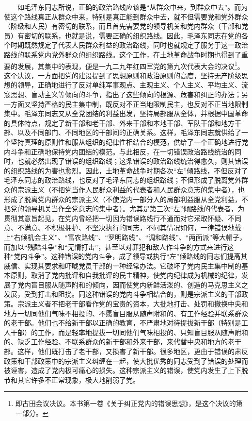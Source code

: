 \documentclass[cn,11pt,chinese]{elegantbook}
\begin{document}
　　如毛泽东同志所说，正确的政治路线应该是“从群众中来，到群众中去”。而为使这个路线真正从群众中来，特别是真正能到群众中去，就不但需要党和党外群众（阶级和人民）有密切的联系，而且首先需要党的领导机关和党内群众（干部和党员）有密切的联系，也就是说，需要正确的组织路线。因此，毛泽东同志在党的各个时期既然规定了代表人民群众利益的政治路线，同时也就规定了服务于这一政治路线的联系党内党外群众的组织路线。这个工作，在土地革命战争时期也得到了重要的发展，其集中的表现，便是一九二九年红四军党的第九次代表大会的决议\footnote[44]{ 即古田会议决议。本书第一卷《关于纠正党内的错误思想》，是这个决议的第一部分。}。这个决议，一方面把党的建设提到了思想原则和政治原则的高度，坚持无产阶级思想的领导，正确地进行了反对单纯军事观点、主观主义、个人主义、平均主义、流寇思想、盲动主义等倾向的斗争，指出了这些倾向的根源、危害和纠正的办法；另一方面又坚持严格的民主集中制，既反对不正当地限制民主，也反对不正当地限制集中。毛泽东同志又从全党团结的利益出发，坚持局部服从全体，并根据中国革命的具体特点，规定了新干部和老干部、外来干部和本地干部、军队干部和地方干部、以及不同部门、不同地区的干部间的正确关系。这样，毛泽东同志就供给了一个坚持真理的原则性和服从组织的纪律性相结合的模范，供给了一个正确地进行党内斗争和正确地保持党内团结的模范。与此相反，在一切错误政治路线统治的同时，也就必然出现了错误的组织路线；这条错误的政治路线统治得愈久，则其错误的组织路线的为害也愈烈。因此，土地革命战争时期各次“左”倾路线，不但反对了毛泽东同志的政治路线，也反对了毛泽东同志的组织路线；不但形成了脱离党外群众的宗派主义（不把党当作人民群众利益的代表者和人民群众意志的集中者），也形成了脱离党内群众的宗派主义（不使党内一部分人的局部利益服从全党利益，不把党的领导机关当作全党意志的集中者）。尤其是第三次“左”倾路线的代表者，为贯彻其意旨起见，在党内曾经把一切因为错误路线行不通而对它采取怀疑、不同意、不满意、不积极拥护、不坚决执行的同志，不问其情况如何，一律错误地戴上“右倾机会主义”、“富农路线”、“罗明路线”、“调和路线”、“两面派”等大帽子，而加以“残酷斗争”和“无情打击”，甚至以对罪犯和敌人作斗争的方式来进行这种“党内斗争”。这种错误的党内斗争，成了领导或执行“左”倾路线的同志们提高其威信、实现其要求和吓唬党员干部的一种经常办法。它破坏了党内民主集中制的基本原则，取消了党内批评和自我批评的民主精神，使党内纪律成为机械的纪律，发展了党内盲目服从随声附和的倾向，因而使党内新鲜活泼的、创造的马克思主义之发展，受到打击和阻挠。同这种错误的党内斗争相结合的，则是宗派主义的干部政策。宗派主义者不把老干部看作党的宝贵的资本，大批地打击、处罚和撤换中央和地方一切同他们气味不相投的、不愿盲目服从随声附和的、有工作经验并联系群众的老干部。他们也不给新干部以正确的教育，不严肃地对待提拔新干部（特别是工人干部）的工作，而是轻率地提拔一切同他们气味相投的、只知盲目服从随声附和的、缺乏工作经验、不联系群众的新干部和外来干部，来代替中央和地方的老干部。这样，他们既打击了老干部，又损害了新干部。很多地区，更由于错误的肃反政策和干部政策中的宗派主义纠缠在一起，使大批优秀的同志受到了错误的处理而被诬害，造成了党内极可痛心的损失。这种宗派主义的错误，使党内发生了上下脱节和其它许多不正常现象，极大地削弱了党。\\
\end{document}
